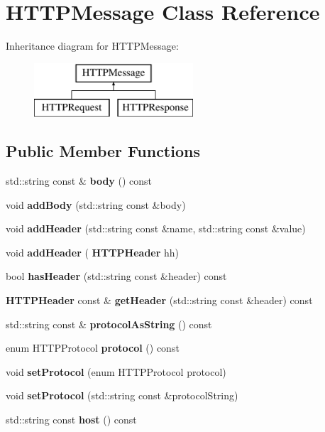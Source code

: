 \section{H\+T\+T\+P\+Message Class Reference}
\label{classHTTPMessage}
Inheritance diagram for H\+T\+T\+P\+Message\+:\begin{figure}[H]
\begin{center}
\leavevmode
\includegraphics[height=2.000000cm]{classHTTPMessage}
\end{center}
\end{figure}
\subsection*{Public Member Functions}
\begin{DoxyCompactItemize}
\item 
\mbox{\label{classHTTPMessage_a53347217afcc62b726e6c9fa1c35fe4e}} 
std\+::string const  \& {\bfseries body} () const
\item 
\mbox{\label{classHTTPMessage_acfeefc663e9baf9a7699f685a8096247}} 
void {\bfseries add\+Body} (std\+::string const \&body)
\item 
\mbox{\label{classHTTPMessage_ac7cd67b181d03c67e30b76a6e5b05951}} 
void {\bfseries add\+Header} (std\+::string const \&name, std\+::string const \&value)
\item 
\mbox{\label{classHTTPMessage_a066ff4ba3f7a43b44c06df2c5033b18b}} 
void {\bfseries add\+Header} (\textbf{ H\+T\+T\+P\+Header} hh)
\item 
\mbox{\label{classHTTPMessage_a77cb91c90993a39e52d8400696fcde0d}} 
bool {\bfseries has\+Header} (std\+::string const \&header) const
\item 
\mbox{\label{classHTTPMessage_a0ef37febc49cacd1ffbf6a18b5ba2e56}} 
\textbf{ H\+T\+T\+P\+Header} const  \& {\bfseries get\+Header} (std\+::string const \&header) const
\item 
\mbox{\label{classHTTPMessage_ae1b96f87223f445c27421d9b603773a4}} 
std\+::string const  \& {\bfseries protocol\+As\+String} () const
\item 
\mbox{\label{classHTTPMessage_a3af96c2eec3afb578d6f58fe275a3451}} 
enum H\+T\+T\+P\+Protocol {\bfseries protocol} () const
\item 
\mbox{\label{classHTTPMessage_a585a4b59c6964476584a732870187f3b}} 
void {\bfseries set\+Protocol} (enum H\+T\+T\+P\+Protocol protocol)
\item 
\mbox{\label{classHTTPMessage_a74ed0085f8a39553ce630e6e2589b7b0}} 
void {\bfseries set\+Protocol} (std\+::string const \&protocol\+String)
\item 
\mbox{\label{classHTTPMessage_ac91b49e73264e0abcc0d53f3cb14cb33}} 
std\+::string const {\bfseries host} () const
\end{DoxyCompactItemize}
